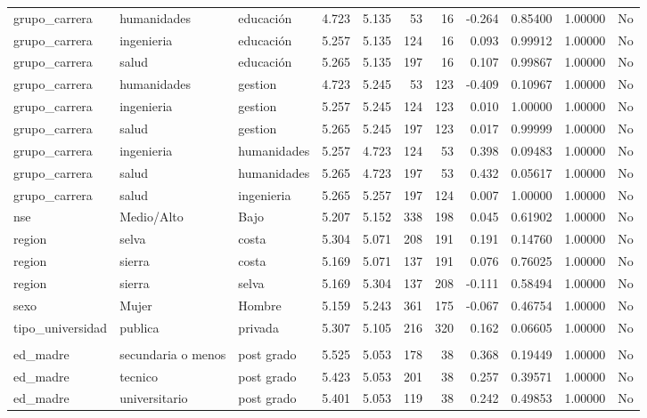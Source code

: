 \documentclass[
  letterpaper,
  DIV=11,
  numbers=noendperiod]{scrartcl}
\begin{document}
\begin{table}
\begin{tabular*}{\linewidth}{@{\extracolsep{\fill}}lllrrrrrrrl}
grupo\_carrera & humanidades & educación & 4.723 & 5.135 & 53 & 16 & -0.264 & 0.85400 & 1.00000 & No \\ 
grupo\_carrera & ingenieria & educación & 5.257 & 5.135 & 124 & 16 & 0.093 & 0.99912 & 1.00000 & No \\ 
grupo\_carrera & salud & educación & 5.265 & 5.135 & 197 & 16 & 0.107 & 0.99867 & 1.00000 & No \\ 
grupo\_carrera & humanidades & gestion & 4.723 & 5.245 & 53 & 123 & -0.409 & 0.10967 & 1.00000 & No \\ 
grupo\_carrera & ingenieria & gestion & 5.257 & 5.245 & 124 & 123 & 0.010 & 1.00000 & 1.00000 & No \\ 
grupo\_carrera & salud & gestion & 5.265 & 5.245 & 197 & 123 & 0.017 & 0.99999 & 1.00000 & No \\ 
grupo\_carrera & ingenieria & humanidades & 5.257 & 4.723 & 124 & 53 & 0.398 & 0.09483 & 1.00000 & No \\ 
grupo\_carrera & salud & humanidades & 5.265 & 4.723 & 197 & 53 & 0.432 & 0.05617 & 1.00000 & No \\ 
grupo\_carrera & salud & ingenieria & 5.265 & 5.257 & 197 & 124 & 0.007 & 1.00000 & 1.00000 & No \\ 
nse & Medio/Alto & Bajo & 5.207 & 5.152 & 338 & 198 & 0.045 & 0.61902 & 1.00000 & No \\ 
region & selva & costa & 5.304 & 5.071 & 208 & 191 & 0.191 & 0.14760 & 1.00000 & No \\ 
region & sierra & costa & 5.169 & 5.071 & 137 & 191 & 0.076 & 0.76025 & 1.00000 & No \\ 
region & sierra & selva & 5.169 & 5.304 & 137 & 208 & -0.111 & 0.58494 & 1.00000 & No \\ 
sexo & Mujer & Hombre & 5.159 & 5.243 & 361 & 175 & -0.067 & 0.46754 & 1.00000 & No \\ 
tipo\_universidad & publica & privada & 5.307 & 5.105 & 216 & 320 & 0.162 & 0.06605 & 1.00000 & No \\ 
\midrule\addlinespace[2.5pt]
\multicolumn{11}{l}{metas} \\[2.5pt] 
\midrule\addlinespace[2.5pt]
ed\_madre & secundaria o menos & post grado & 5.525 & 5.053 & 178 & 38 & 0.368 & 0.19449 & 1.00000 & No \\ 
ed\_madre & tecnico & post grado & 5.423 & 5.053 & 201 & 38 & 0.257 & 0.39571 & 1.00000 & No \\ 
ed\_madre & universitario & post grado & 5.401 & 5.053 & 119 & 38 & 0.242 & 0.49853 & 1.00000 & No \\ 

\end{tabular*}
\end{table}
\end{document}
